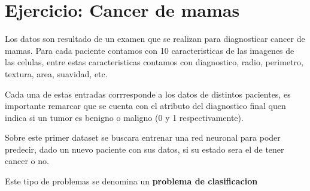 \section{Ejercicio: Cancer de mamas}
Los datos son resultado de un examen que se realizan para diagnosticar cancer de mamas. Para cada paciente contamos con 10 caracteristicas de las imagenes de las celulas, entre estas caracteristicas contamos con diagnostico, radio, perimetro, textura, area, suavidad, etc. 

Cada una de estas entradas corrresponde a los datos de distintos pacientes, es importante remarcar que se cuenta con el atributo del diagnostico final quen indica si un tumor es benigno o maligno (0 y 1 respectivamente).

Sobre este primer dataset se buscara entrenar una red neuronal para poder predecir, dado un nuevo paciente con sus datos, si su estado sera el de tener cancer o no.

Este tipo de problemas se denomina un \textbf{problema de clasificacion}
